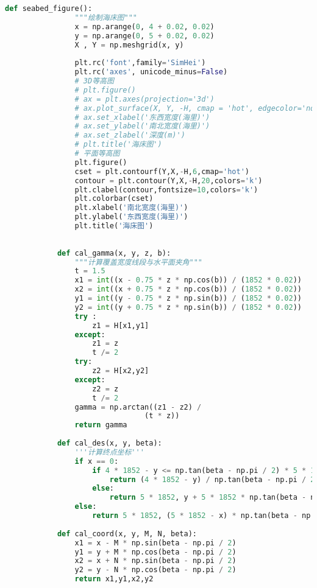 \documentclass[withoutpreface,bwprint]{cumcmthesis} %
\begin{document}
\begin{appendices}
\begin{lstlisting}[language=python]
            def seabed_figure():
                """绘制海床图"""
                x = np.arange(0, 4 + 0.02, 0.02)
                y = np.arange(0, 5 + 0.02, 0.02)
                X , Y = np.meshgrid(x, y)
            
                plt.rc('font',family='SimHei')
                plt.rc('axes', unicode_minus=False)
                # 3D等高图
                # plt.figure()
                # ax = plt.axes(projection='3d')
                # ax.plot_surface(X, Y, -H, cmap = 'hot', edgecolor='none')
                # ax.set_xlabel('东西宽度(海里)')
                # ax.set_ylabel('南北宽度(海里)')
                # ax.set_zlabel('深度(m)')
                # plt.title('海床图')
                # 平面等高图
                plt.figure()
                cset = plt.contourf(Y,X,-H,6,cmap='hot') 
                contour = plt.contour(Y,X,-H,20,colors='k')
                plt.clabel(contour,fontsize=10,colors='k')
                plt.colorbar(cset)
                plt.xlabel('南北宽度(海里)')
                plt.ylabel('东西宽度(海里)')
                plt.title('海床图')
            
            
            def cal_gamma(x, y, z, b):
                """计算覆盖宽度线段与水平面夹角"""
                t = 1.5
                x1 = int((x - 0.75 * z * np.cos(b)) / (1852 * 0.02))
                x2 = int((x + 0.75 * z * np.cos(b)) / (1852 * 0.02))
                y1 = int((y - 0.75 * z * np.sin(b)) / (1852 * 0.02))
                y2 = int((y + 0.75 * z * np.sin(b)) / (1852 * 0.02))
                try : 
                    z1 = H[x1,y1]
                except:
                    z1 = z
                    t /= 2
                try:
                    z2 = H[x2,y2]
                except:
                    z2 = z
                    t /= 2
                gamma = np.arctan((z1 - z2) / 
                                (t * z))
                return gamma
            
            def cal_des(x, y, beta):
                '''计算终点坐标'''
                if x == 0:
                    if 4 * 1852 - y <= np.tan(beta - np.pi / 2) * 5 * 1852:
                        return (4 * 1852 - y) / np.tan(beta - np.pi / 2) ,4 * 1852
                    else:
                        return 5 * 1852, y + 5 * 1852 * np.tan(beta - np.pi / 2)
                else:
                    return 5 * 1852, (5 * 1852 - x) * np.tan(beta - np.pi / 2)
                
            def cal_coord(x, y, M, N, beta):
                x1 = x - M * np.sin(beta - np.pi / 2)
                y1 = y + M * np.cos(beta - np.pi / 2)
                x2 = x + N * np.sin(beta - np.pi / 2)
                y2 = y - N * np.cos(beta - np.pi / 2)
                return x1,y1,x2,y2
            

\end{lstlisting}
\end{appendices}
\end{document}
